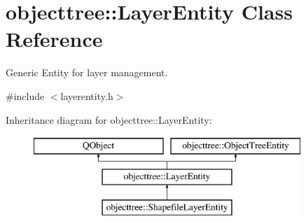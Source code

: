 \hypertarget{classobjecttree_1_1_layer_entity}{}\section{objecttree\+::Layer\+Entity Class Reference}
\label{classobjecttree_1_1_layer_entity}


Generic Entity for layer management.  




{\ttfamily \#include $<$layerentity.\+h$>$}

Inheritance diagram for objecttree\+::Layer\+Entity\+:\begin{figure}[H]
\begin{center}
\leavevmode
\includegraphics[height=3.000000cm]{db/d2f/classobjecttree_1_1_layer_entity}
\end{center}
\end{figure}
